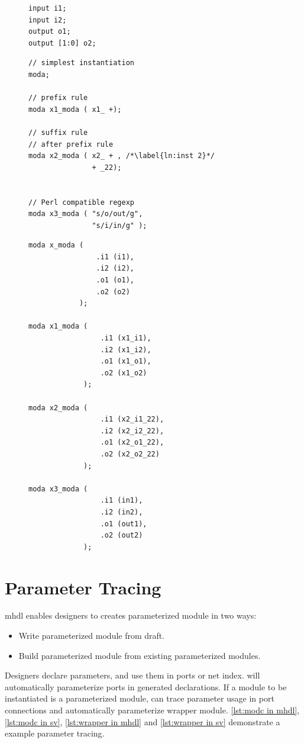 \begin{figure}[p]
  \begin{minipage}[t]{.48\textwidth}
    \begin{lstlisting}[caption={\texttt{moda.mhdl}}]
input i1;
input i2;
output o1;
output [1:0] o2;
    \end{lstlisting}
    \begin{lstlisting}[caption={Instantiation in MetaHDL}]
// simplest instantiation
moda;

// prefix rule
moda x1_moda ( x1_ +);

// suffix rule
// after prefix rule
moda x2_moda ( x2_ + , /*\label{ln:inst 2}*/
               + _22);


// Perl compatible regexp
moda x3_moda ( "s/o/out/g", 
               "s/i/in/g" );
    \end{lstlisting}
  \end{minipage}
  \hfill
  \begin{minipage}[t]{.48\textwidth}
    \begin{lstlisting}[caption={Generated SystemVerilog}]
moda x_moda (
                .i1 (i1),
                .i2 (i2),
                .o1 (o1),
                .o2 (o2)
            );

moda x1_moda (
                 .i1 (x1_i1),
                 .i2 (x1_i2),
                 .o1 (x1_o1),
                 .o2 (x1_o2)
             );

moda x2_moda (
                 .i1 (x2_i1_22),
                 .i2 (x2_i2_22),
                 .o1 (x2_o1_22),
                 .o2 (x2_o2_22)
             );

moda x3_moda (
                 .i1 (in1),
                 .i2 (in2),
                 .o1 (out1),
                 .o2 (out2)
             );
    \end{lstlisting}
  \end{minipage}
\end{figure}


\section{Parameter Tracing}
\gls{mhdl} enables designers to creates parameterized module in two ways: 
\begin{itemize}
\item Write parameterized module from draft.
\item Build parameterized module from existing parameterized modules. 
\end{itemize}
Designers declare parameters, and use them in ports or net index. \mhdlc{} 
will automatically parameterize ports in generated declarations. If a module 
to be instantiated is a parameterized module, \mhdlc{} can trace parameter usage
in port connections and automatically parameterize wrapper module. 
\autoref{lst:modc in mhdl}, \autoref{lst:modc in sv}, \autoref{lst:wrapper in mhdl} and 
\autoref{lst:wrapper in sv} demonstrate a example parameter tracing.

